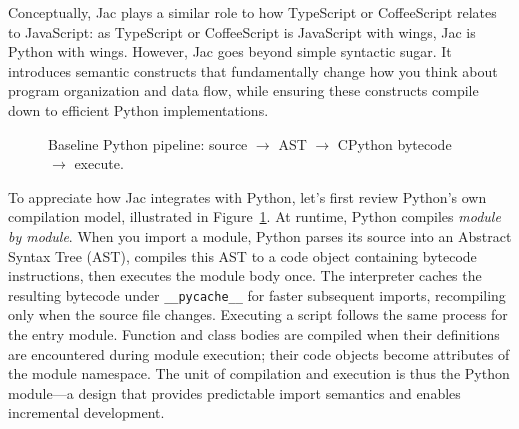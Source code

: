 Conceptually, Jac plays a similar role to how TypeScript or CoffeeScript relates to JavaScript: as TypeScript or CoffeeScript is JavaScript with wings, Jac is Python with wings. However, Jac goes beyond simple syntactic sugar. It introduces semantic constructs that fundamentally change how you think about program organization and data flow, while ensuring these constructs compile down to efficient Python implementations.

\begin{figure}[t]
    \centering
    \caption[]{Baseline Python pipeline: source \(\to\) AST \(\to\) CPython bytecode \(\to\) execute.}
    \label{fig:py-pipeline}
\end{figure}

To appreciate how Jac integrates with Python, let's first review Python's own compilation model, illustrated in Figure~\ref{fig:py-pipeline}. At runtime, Python compiles \emph{module by module}. When you import a module, Python parses its source into an Abstract Syntax Tree (AST), compiles this AST to a code object containing bytecode instructions, then executes the module body once. The interpreter caches the resulting bytecode under \texttt{\_\_pycache\_\_} for faster subsequent imports, recompiling only when the source file changes. Executing a script follows the same process for the entry module. Function and class bodies are compiled when their definitions are encountered during module execution; their code objects become attributes of the module namespace. The unit of compilation and execution is thus the Python module—a design that provides predictable import semantics and enables incremental development.

